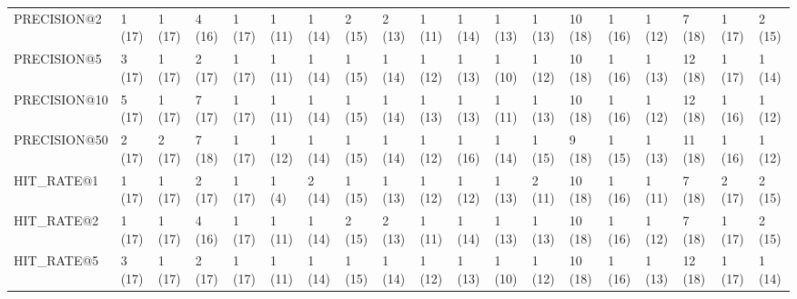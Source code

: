 \begin{tabular}{lllllllllllllllllll}
PRECISION@2  &       1 (17) &             1 (17) &        4 (16) &          1 (17) &    1 (11) &                            1 (14) &                         2 (15) &                             2 (13) &         1 (11) &             1 (14) &             1 (13) &             1 (13) &  10 (18) &                    1 (16) &          1 (12) &   7 (18) &  1 (17) &    2 (15) \\
PRECISION@5  &       3 (17) &             1 (17) &        2 (17) &          1 (17) &    1 (11) &                            1 (14) &                         1 (15) &                             1 (14) &         1 (12) &             1 (13) &             1 (10) &             1 (12) &  10 (18) &                    1 (16) &          1 (13) &  12 (18) &  1 (17) &    1 (14) \\
PRECISION@10 &       5 (17) &             1 (17) &        7 (17) &          1 (17) &    1 (11) &                            1 (14) &                         1 (15) &                             1 (14) &         1 (13) &             1 (13) &             1 (11) &             1 (13) &  10 (18) &                    1 (16) &          1 (12) &  12 (18) &  1 (16) &    1 (12) \\
PRECISION@50 &       2 (17) &             2 (17) &        7 (18) &          1 (17) &    1 (12) &                            1 (14) &                         1 (15) &                             1 (14) &         1 (12) &             1 (16) &             1 (14) &             1 (15) &   9 (18) &                    1 (15) &          1 (13) &  11 (18) &  1 (16) &    1 (12) \\
HIT\_RATE@1   &       1 (17) &             1 (17) &        2 (17) &          1 (17) &     1 (4) &                            2 (14) &                         1 (15) &                             1 (13) &         1 (12) &             1 (12) &             1 (13) &             2 (11) &  10 (18) &                    1 (16) &          1 (11) &   7 (18) &  2 (17) &    2 (15) \\
HIT\_RATE@2   &       1 (17) &             1 (17) &        4 (16) &          1 (17) &    1 (11) &                            1 (14) &                         2 (15) &                             2 (13) &         1 (11) &             1 (14) &             1 (13) &             1 (13) &  10 (18) &                    1 (16) &          1 (12) &   7 (18) &  1 (17) &    2 (15) \\
HIT\_RATE@5   &       3 (17) &             1 (17) &        2 (17) &          1 (17) &    1 (11) &                            1 (14) &                         1 (15) &                             1 (14) &         1 (12) &             1 (13) &             1 (10) &             1 (12) &  10 (18) &                    1 (16) &          1 (13) &  12 (18) &  1 (17) &    1 (14) \\

\end{tabular}
